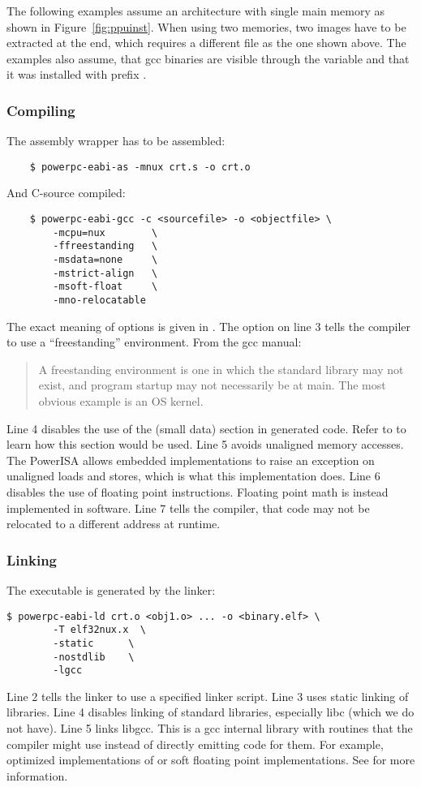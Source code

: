 The following examples assume an architecture with single main memory as shown in Figure~\ref{fig:ppuinst}.
When using two memories, two images have to be extracted at the end, which requires a different  file as the one shown above.
The examples also assume, that gcc binaries are visible through the  variable and that it was installed with prefix .


\subsubsection{Compiling}

The assembly wrapper has to be assembled:
\begin{lstlisting}
    $ powerpc-eabi-as -mnux crt.s -o crt.o
\end{lstlisting}
And C-source compiled:
\begin{lstlisting}
    $ powerpc-eabi-gcc -c <sourcefile> -o <objectfile> \
        -mcpu=nux        \
        -ffreestanding   \
        -msdata=none     \
        -mstrict-align   \
        -msoft-float     \
        -mno-relocatable
\end{lstlisting}
The exact meaning of options is given in \cite{gccmanual}.
The option on line 3 tells the compiler to use a ``freestanding'' environment.
From the gcc manual:
\begin{quote}
   A freestanding environment is one in which the standard library may not exist, and program startup may not necessarily be at main.
   The most obvious example is an OS kernel. 
\end{quote}
Line 4 disables the use of the \code{.sdata} (small data) section in generated code.
Refer to \cite{IBM1998} to learn how this section would be used.
Line 5 avoids unaligned memory accesses.
The PowerISA allows embedded implementations to raise an exception on unaligned loads and stores, which is what this implementation does.
Line 6 disables the use of floating point instructions.
Floating point math is instead implemented in software.
Line 7 tells the compiler, that code may not be relocated to a different address at runtime.


\subsubsection{Linking}

The executable is generated by the linker:
\begin{lstlisting}
$ powerpc-eabi-ld crt.o <obj1.o> ... -o <binary.elf> \
        -T elf32nux.x  \
        -static      \
        -nostdlib    \
        -lgcc
\end{lstlisting}
Line 2 tells the linker to use a specified linker script.
Line 3 uses static linking of libraries.
Line 4 disables linking of standard libraries, especially libc (which we do not have).
Line 5 links libgcc.
This is a gcc internal library with routines that the compiler might use instead of directly emitting code for them.
For example, optimized implementations of  or soft floating point implementations.
See \cite{libgcc} for more information.


